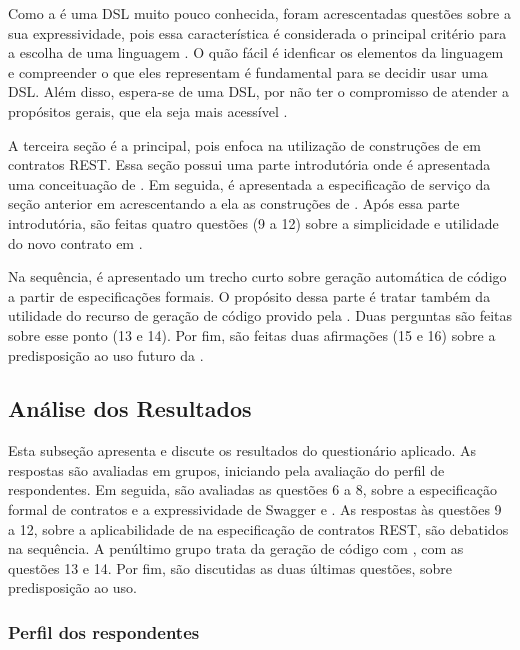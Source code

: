Como a \neoidl{} é uma DSL muito pouco conhecida, foram acrescentadas questões
sobre a sua expressividade, pois essa característica é considerada o principal
critério para a escolha de uma linguagem \cite{mackinlay1985expressiveness}. O
quão fácil é idenficar os elementos da linguagem e compreender o que eles
representam é fundamental para se decidir usar uma DSL. Além disso, espera-se de uma DSL, por
não ter o compromisso de atender a propósitos gerais, que ela seja mais
acessível \cite{taha2008domain}. 

A terceira seção é a principal, pois enfoca na utilização de construções de
\designbycontract{} em contratos REST. Essa seção possui uma parte introdutória
onde é apresentada uma conceituação de \designbycontract{}. Em seguida, é
apresentada a especificação de serviço da seção anterior em \neoidl{}
acrescentando a ela	 as construções de \designbycontract{}. Após essa parte
introdutória, são feitas quatro questões (9 a 12) sobre a simplicidade e
utilidade do novo contrato em \neoidl{}.

Na sequência, é apresentado um trecho curto sobre geração automática de código a
partir de especificações formais. O propósito dessa parte é tratar também da
utilidade do recurso de geração de código provido pela \neoidl{}. Duas perguntas
são feitas sobre esse ponto (13 e 14). Por fim, são feitas duas afirmações (15
e 16) sobre a predisposição ao uso futuro da \neoidl{}.

\subsection{Análise dos Resultados}
\label{AnaliseQuestionario}


Esta subseção apresenta e discute os resultados do questionário aplicado. As
respostas são avaliadas em grupos, iniciando pela avaliação do perfil de
respondentes. Em seguida, são avaliadas as questões 6 a 8, sobre a especificação
formal de contratos e a expressividade de Swagger e \neoidl{}. As respostas às
questões 9 a 12, sobre a aplicabilidade de \designbycontract{} na especificação
 de contratos REST, são debatidos na sequência. A penúltimo grupo trata da
 geração de código com \designbycontract{}, com as questões 13 e 14. Por fim,
 são discutidas as duas últimas questões, sobre predisposição ao uso.

\subsubsection{Perfil dos respondentes}

